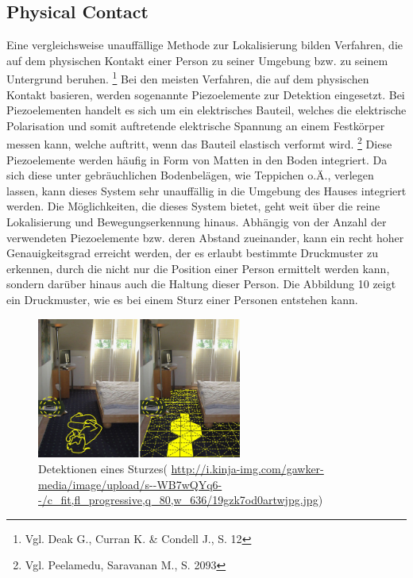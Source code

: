 \subsection{Physical Contact}
Eine vergleichsweise unauffällige Methode zur Lokalisierung bilden Verfahren, die auf dem physischen Kontakt einer Person zu seiner Umgebung bzw. zu seinem Untergrund beruhen. \footnote{Vgl. Deak G., Curran K. \& Condell J., S. 12} Bei den meisten Verfahren, die auf dem physischen Kontakt basieren, werden sogenannte Piezoelemente zur Detektion eingesetzt. Bei Piezoelementen handelt es sich um ein elektrisches Bauteil, welches die elektrische Polarisation und somit auftretende elektrische Spannung an einem Festkörper messen kann, welche auftritt, wenn das Bauteil elastisch verformt wird. \footnote{Vgl. Peelamedu, Saravanan M., S. 2093} \newline\newline
Diese Piezoelemente werden häufig in Form von Matten in den Boden integriert. Da sich diese unter gebräuchlichen Bodenbelägen, wie Teppichen o.Ä., verlegen lassen, kann dieses System sehr unauffällig in die Umgebung des Hauses integriert werden. Die Möglichkeiten, die dieses System bietet, geht weit über die reine Lokalisierung und Bewegungserkennung hinaus.
Abhängig von der Anzahl der verwendeten Piezoelemente bzw. deren Abstand zueinander, kann ein recht hoher Genauigkeitsgrad erreicht werden, der es erlaubt bestimmte Druckmuster zu erkennen, durch die nicht nur die Position einer Person ermittelt werden kann, sondern darüber hinaus auch die Haltung dieser Person. Die Abbildung 10 zeigt ein Druckmuster, wie es bei einem Sturz einer Personen entstehen kann.\\

\begin{figure}[H]
	\centering
	\includegraphics[width=0.6\textwidth]{pictures/piezo}
	\caption{Detektionen eines Sturzes( \url{http://i.kinja-img.com/gawker-media/image/upload/s--WB7wQYq6--/c_fit,fl_progressive,q_80,w_636/19gzk7od0artwjpg.jpg})}
\end{figure} 

